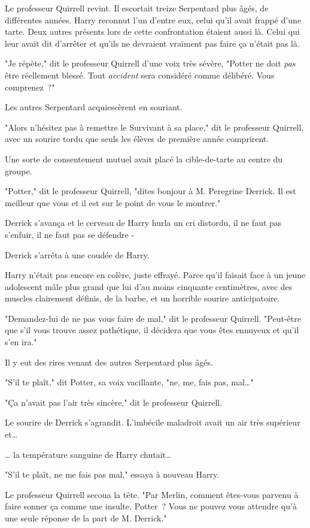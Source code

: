 Le professeur Quirrell revint. Il escortait treize Serpentard plus âgés, de différentes années. Harry reconnut l'un d'entre eux, celui qu'il avait frappé d'une tarte. Deux autres présents lors de cette confrontation étaient aussi là. Celui qui leur avait dit d'arrêter et qu'ils ne devraient vraiment pas faire ça n'était pas là.

"Je répète," dit le professeur Quirrell d'une voix très sévère, "Potter ne doit \emph{pas} être réellement blessé. Tout \emph{accident} sera considéré comme délibéré. Vous comprenez~?"

Les autres Serpentard acquiescèrent en souriant.

"Alors n'hésitez pas à remettre le Survivant à sa place," dit le professeur Quirrell, avec un sourire tordu que seuls les élèves de première année comprirent.

Une sorte de consentement mutuel avait placé la cible-de-tarte au centre du groupe.

"Potter," dit le professeur Quirrell, "dites bonjour à M. Peregrine Derrick. Il est meilleur que vous et il est sur le point de vous le montrer."

Derrick s'avança et le cerveau de Harry hurla un cri distordu, il ne faut pas s'enfuir, il ne faut pas se défendre -

Derrick s'arrêta à une coudée de Harry.

Harry n'était pas encore en colère, juste effrayé. Parce qu'il faisait face à un jeune adolescent mâle plus grand que lui d'au moins cinquante centimètres, avec des muscles clairement définis, de la barbe, et un horrible sourire anticipatoire.

"Demandez-lui de ne pas vous faire de mal," dit le professeur Quirrell. "Peut-être que s'il vous trouve assez pathétique, il décidera que vous êtes ennuyeux et qu'il s'en ira."

Il y eut des rires venant des autres Serpentard plus âgés.

"S'il te plaît," dit Potter, sa voix vacillante, "ne, me, fais pas, mal…"

"Ça n'avait pas l'air très sincère," dit le professeur Quirrell.

Le sourire de Derrick s'agrandit. L'imbécile maladroit avait un air très supérieur et…

… la température sanguine de Harry chutait…

"S'il te plaît, ne me fais pas mal," essaya à nouveau Harry.

Le professeur Quirrell secoua la tête. "Par Merlin, comment êtes-vous parvenu à faire sonner ça comme une insulte, Potter~? Vous ne pouvez vous attendre qu'à une seule réponse de la part de M. Derrick."

